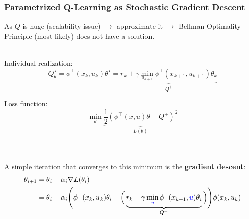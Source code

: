 \subsubsection{Parametrized Q-Learning as Stochastic Gradient Descent}
As $Q$ is huge (scalability issue) $\rightarrow$ approximate it $\rightarrow$ Bellman Optimality Principle (most likely) does not have a solution. \\ \\
\begin{minipage}{0.48\textwidth}
    Individual realization:
    \[
    Q_\theta^\star = \phi^\top (x_k, u_k) \theta^\star = \underbrace{r_k + \gamma \min_{u_{k+1}} \phi^\top(x_{k+1}, u_{k+1}) \theta_k}_{Q^+}
    \]
\end{minipage}
\begin{minipage}{0.48\textwidth}
    Loss function:
    \[
    \min_{\theta} \underbrace{\frac{1}{2} \left( \phi^\top (x, u) \theta - Q^+ \right)^2}_{L(\theta)}
    \]
\end{minipage} \\ \\
A simple iteration that converges to this minimum is the \textbf{gradient descent}:
\begin{align*}
    \theta_{i+1} &= \theta_i - \alpha_i \nabla L(\theta_i) \\
    &= \theta_i - \alpha_i \Bigg( \phi^\top (x_k, u_k) \theta_i - \Big( \underbrace{r_k + \gamma \min_{\color{blue}u} \phi^\top (x_{k+1}, {\color{blue}u}) \theta_i}_{Q^+} \Big) \Bigg) \phi (x_k, u_k)
\end{align*}

\newpage
    
